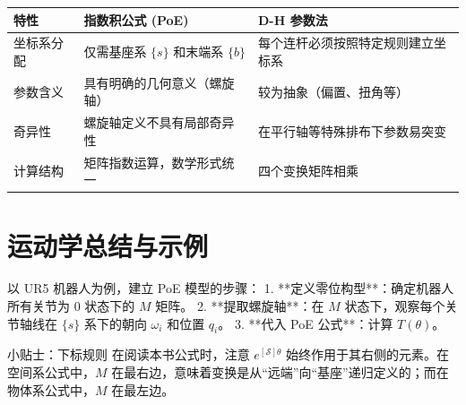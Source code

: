 \begin{table}[h]
\centering
\begin{tabular}{|l|p{6cm}|p{6cm}|}
\hline
\textbf{特性} & \textbf{指数积公式 (PoE)} & \textbf{D-H 参数法} \\ \hline
坐标系分配 & 仅需基座系 $\{s\}$ 和末端系 $\{b\}$ & 每个连杆必须按照特定规则建立坐标系 \\ \hline
参数含义 & 具有明确的几何意义（螺旋轴） & 较为抽象（偏置、扭角等） \\ \hline
奇异性 & 螺旋轴定义不具有局部奇异性 & 在平行轴等特殊排布下参数易突变 \\ \hline
计算结构 & 矩阵指数运算，数学形式统一 & 四个变换矩阵相乘 \\ \hline
\end{tabular}
\end{table}

\section{运动学总结与示例}

以 UR5 机器人为例，建立 PoE 模型的步骤：
1. **定义零位构型**：确定机器人所有关节为 0 状态下的 $M$ 矩阵。
2. **提取螺旋轴**：在 $M$ 状态下，观察每个关节轴线在 $\{s\}$ 系下的朝向 $\omega_i$ 和位置 $q_i$。
3. **代入 PoE 公式**：计算 $T(\theta)$。



\begin{mybox}{小贴士：下标规则}
在阅读本书公式时，注意 $e^{[\mathcal{S}]\theta}$ 始终作用于其右侧的元素。在空间系公式中，$M$ 在最右边，意味着变换是从“远端”向“基座”递归定义的；而在物体系公式中，$M$ 在最左边。
\end{mybox}

